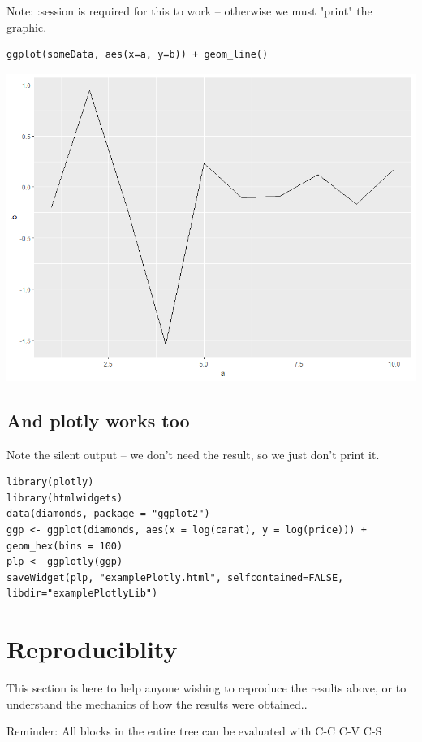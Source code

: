 \documentclass[11pt]{article}
\begin{document}
Note: :session is required for this to work -- otherwise we must "print" the graphic.

\begin{verbatim}
ggplot(someData, aes(x=a, y=b)) + geom_line()
\end{verbatim}

\begin{center}
\includegraphics[width=.9\linewidth]{rOut1.png}
\end{center}

\subsection{And plotly works too}
\label{sec:org4951e9f}

Note the silent output -- we don't need the result, so we just don't print it.

\begin{verbatim}
library(plotly)
library(htmlwidgets)
data(diamonds, package = "ggplot2")
ggp <- ggplot(diamonds, aes(x = log(carat), y = log(price))) + geom_hex(bins = 100)
plp <- ggplotly(ggp)
saveWidget(plp, "examplePlotly.html", selfcontained=FALSE, libdir="examplePlotlyLib")
\end{verbatim}

\section{Reproduciblity}
\label{sec:orgc8994c6}

This section is here to help anyone wishing to reproduce the results above, or to understand the mechanics of how the results were obtained..

Reminder: All blocks in the entire tree can be evaluated with C-C C-V C-S
\end{document}
